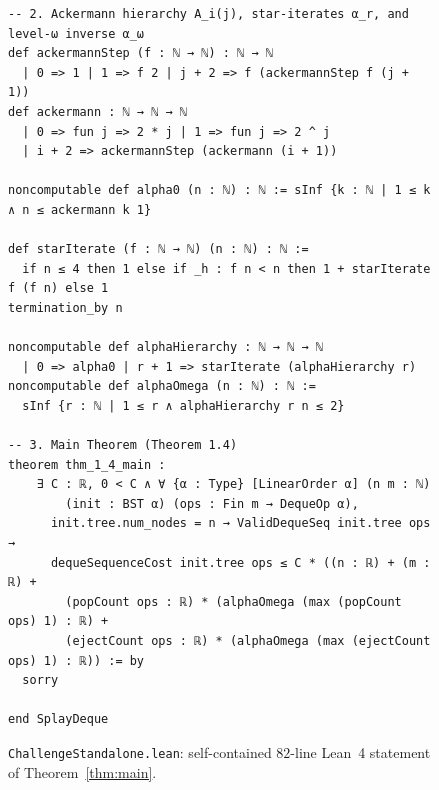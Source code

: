 \documentclass[11pt]{article}
\theoremstyle{definition}
\theoremstyle{remark}
\begin{document}
\begin{figure}[p]
\begin{lstlisting}[style=leanstyle]
-- 2. Ackermann hierarchy A_i(j), star-iterates α_r, and level-ω inverse α_ω
def ackermannStep (f : ℕ → ℕ) : ℕ → ℕ
  | 0 => 1 | 1 => f 2 | j + 2 => f (ackermannStep f (j + 1))
def ackermann : ℕ → ℕ → ℕ
  | 0 => fun j => 2 * j | 1 => fun j => 2 ^ j
  | i + 2 => ackermannStep (ackermann (i + 1))

noncomputable def alpha0 (n : ℕ) : ℕ := sInf {k : ℕ | 1 ≤ k ∧ n ≤ ackermann k 1}

def starIterate (f : ℕ → ℕ) (n : ℕ) : ℕ :=
  if n ≤ 4 then 1 else if _h : f n < n then 1 + starIterate f (f n) else 1
termination_by n

noncomputable def alphaHierarchy : ℕ → ℕ → ℕ
  | 0 => alpha0 | r + 1 => starIterate (alphaHierarchy r)
noncomputable def alphaOmega (n : ℕ) : ℕ :=
  sInf {r : ℕ | 1 ≤ r ∧ alphaHierarchy r n ≤ 2}

-- 3. Main Theorem (Theorem 1.4)
theorem thm_1_4_main :
    ∃ C : ℝ, 0 < C ∧ ∀ {α : Type} [LinearOrder α] (n m : ℕ)
        (init : BST α) (ops : Fin m → DequeOp α),
      init.tree.num_nodes = n → ValidDequeSeq init.tree ops →
      dequeSequenceCost init.tree ops ≤ C * ((n : ℝ) + (m : ℝ) +
        (popCount ops : ℝ) * (alphaOmega (max (popCount ops) 1) : ℝ) +
        (ejectCount ops : ℝ) * (alphaOmega (max (ejectCount ops) 1) : ℝ)) := by
  sorry

end SplayDeque
\end{lstlisting}
\vspace{-2pt}
\caption{\texttt{ChallengeStandalone.lean}: self-contained $82$-line Lean~4 statement of Theorem~\ref{thm:main}.}
\label{fig:lean-challenge}
\end{figure}
\clearpage



\end{document}
